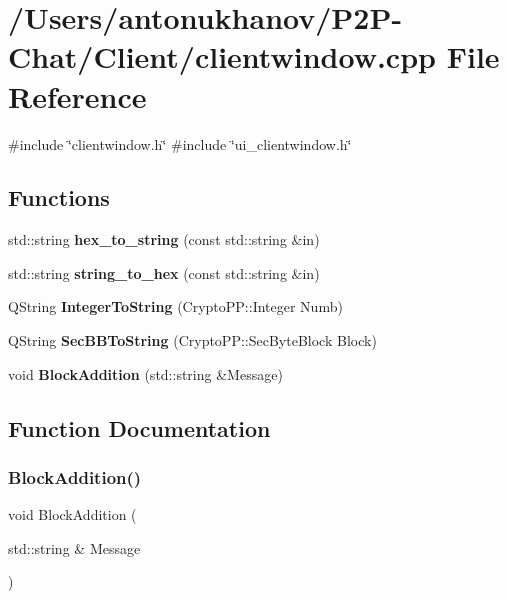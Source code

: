 \section{/\+Users/antonukhanov/\+P2\+P-\/\+Chat/\+Client/clientwindow.cpp File Reference}
\label{clientwindow_8cpp}
{\ttfamily \#include \char`\"{}clientwindow.\+h\char`\"{}}\newline
{\ttfamily \#include \char`\"{}ui\+\_\+clientwindow.\+h\char`\"{}}\newline
\subsection*{Functions}
\begin{DoxyCompactItemize}
\item 
std\+::string \textbf{ hex\+\_\+to\+\_\+string} (const std\+::string \&in)
\item 
std\+::string \textbf{ string\+\_\+to\+\_\+hex} (const std\+::string \&in)
\item 
Q\+String \textbf{ Integer\+To\+String} (Crypto\+P\+P\+::\+Integer Numb)
\item 
Q\+String \textbf{ Sec\+B\+B\+To\+String} (Crypto\+P\+P\+::\+Sec\+Byte\+Block Block)
\item 
void \textbf{ Block\+Addition} (std\+::string \&Message)
\end{DoxyCompactItemize}


\subsection{Function Documentation}
\mbox{\label{clientwindow_8cpp_ae2dede72e01752786db39b0187c3d784}} 
\subsubsection{Block\+Addition()}
{\footnotesize\ttfamily void Block\+Addition (\begin{DoxyParamCaption}\item[{std\+::string \&}]{Message }\end{DoxyParamCaption})}

\mbox{\label{clientwindow_8cpp_ae11e6f26473850e522d3fec533b4743d}} 
